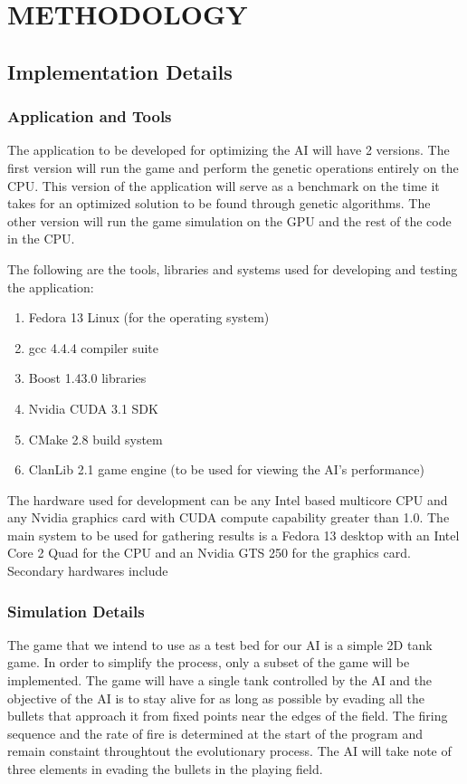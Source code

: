 \chapter{METHODOLOGY}
%
%
\section{Implementation Details}

\subsection{Application and Tools}
The application to be developed for optimizing the AI will have 2 versions.
The first version will run the game and perform the genetic operations entirely
on the CPU. This version of the application will serve as a benchmark on the
time it takes for an optimized solution to be found through genetic algorithms.
The other version will run the game simulation on the GPU and the rest of the
code in the CPU.


The following are the tools, libraries and systems used for developing and testing
the application:

\begin{enumerate}
  \item Fedora 13 Linux (for the operating system)
  \item gcc 4.4.4 compiler suite
  \item Boost 1.43.0 libraries
  \item Nvidia CUDA 3.1 SDK
  \item CMake 2.8 build system
  \item ClanLib 2.1 game engine (to be used for viewing the AI's performance)
\end{enumerate}

The hardware used for development can be any Intel based multicore CPU and any Nvidia
graphics card with CUDA compute capability greater than 1.0. The main system to be
used for gathering results is a Fedora 13 desktop with an Intel Core 2 Quad for the
CPU and an Nvidia GTS 250 for the graphics card.  Secondary hardwares include %


\subsection{Simulation Details}
The game that we intend to use as a test bed for our AI is a simple 2D tank game.
In order to simplify the process, only a subset of the game will be implemented.
The game will have a single tank controlled by the AI and the objective of the AI
is to stay alive for as long as possible by evading all the bullets that approach
it from fixed points near the edges of the field. The firing sequence and the rate of fire is determined at the start of the program and remain constaint throughtout the evolutionary process. The AI will take note of three
elements in evading the bullets in the playing field.

